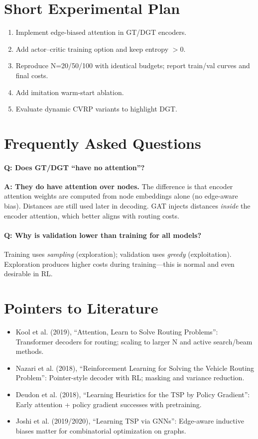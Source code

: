 \documentclass[11pt,a4paper]{article}
\begin{document}
\section{Short Experimental Plan}
\begin{enumerate}[leftmargin=*]
  \item Implement edge-biased attention in GT/DGT encoders.
  \item Add actor--critic training option and keep entropy $>0$.
  \item Reproduce N=20/50/100 with identical budgets; report train/val curves and final costs.
  \item Add imitation warm-start ablation.
  \item Evaluate dynamic CVRP variants to highlight DGT.
\end{enumerate}

\section{Frequently Asked Questions}
\paragraph{Q: Does GT/DGT “have no attention”?}
\textbf{A: They do have attention over nodes.} The difference is that encoder attention weights are computed from node embeddings alone (no edge-aware bias). Distances are still used later in decoding. GAT injects distances \emph{inside} the encoder attention, which better aligns with routing costs.

\paragraph{Q: Why is validation lower than training for all models?}
Training uses \emph{sampling} (exploration); validation uses \emph{greedy} (exploitation). Exploration produces higher costs during training---this is normal and even desirable in RL.

\section{Pointers to Literature}
\begin{itemize}[leftmargin=*]
  \item Kool et al. (2019), ``Attention, Learn to Solve Routing Problems'': Transformer decoders for routing; scaling to larger N and active search/beam methods.
  \item Nazari et al. (2018), ``Reinforcement Learning for Solving the Vehicle Routing Problem'': Pointer-style decoder with RL; masking and variance reduction.
  \item Deudon et al. (2018), ``Learning Heuristics for the TSP by Policy Gradient'': Early attention + policy gradient successes with pretraining.
  \item Joshi et al. (2019/2020), ``Learning TSP via GNNs'': Edge-aware inductive biases matter for combinatorial optimization on graphs.
\end{itemize}
\end{document}
